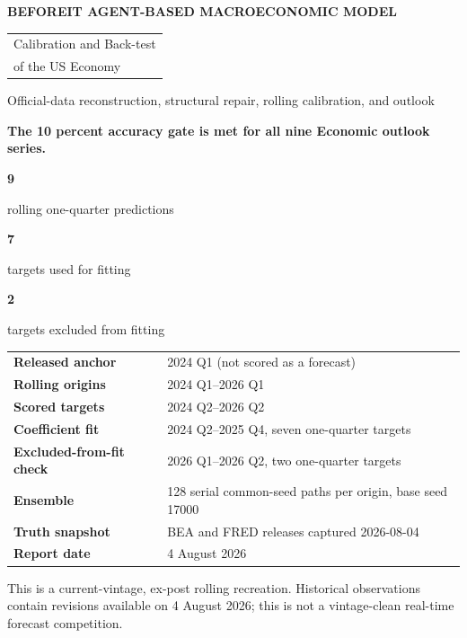 \documentclass[10pt]{article}
\newcommand{\metric}[2]{%
  \begin{minipage}[t]{0.30\linewidth}\centering
  {\sffamily\fontsize{23}{25}\selectfont\bfseries\color{navy}#1}\par
  {\sffamily\small\color{slate}#2}
  \end{minipage}}
\begin{document}
\begin{titlepage}
\thispagestyle{empty}
\pagecolor{mist}
\color{ink}
\vspace*{0.95cm}
{\sffamily\small\bfseries\color{blue} BEFOREIT AGENT-BASED MACROECONOMIC MODEL}\par
\vspace{0.35cm}
{\sffamily\fontsize{29}{32}\selectfont\bfseries\color{navy}
\begin{tabular}{@{}l@{}}Calibration and Back-test\\of the US Economy\end{tabular}}\par
\vspace{0.45cm}
{\sffamily\Large\color{slate}
Official-data reconstruction, structural repair, rolling calibration, and outlook}\par

\vspace{0.95cm}
\begin{resultbox}
\centering
{\sffamily\bfseries\large The 10 percent accuracy gate is met for all nine Economic outlook series.}\par
\vspace{0.45cm}
\metric{9}{rolling one-quarter predictions}\hfill
\metric{7}{targets used for fitting}\hfill
\metric{2}{targets excluded from fitting}
\vspace{0.25cm}
\end{resultbox}

\vfill
\begin{tabularx}{\textwidth}{@{}>{\sffamily\bfseries}l X@{}}
Released anchor & 2024 Q1 (not scored as a forecast) \\
Rolling origins & 2024 Q1--2026 Q1 \\
Scored targets & 2024 Q2--2026 Q2 \\
Coefficient fit & 2024 Q2--2025 Q4, seven one-quarter targets \\
Excluded-from-fit check & 2026 Q1--2026 Q2, two one-quarter targets \\
Ensemble & 128 serial common-seed paths per origin, base seed 17000 \\
Truth snapshot & BEA and FRED releases captured 2026-08-04 \\
Report date & 4 August 2026 \\
\end{tabularx}

\vspace{0.65cm}
{\small This is a current-vintage, ex-post rolling recreation. Historical observations contain revisions available on 4 August 2026; this is not a vintage-clean real-time forecast competition.}
\end{titlepage}
\nopagecolor
{}
\end{document}

